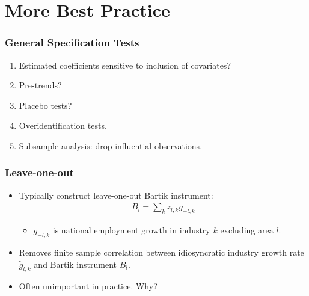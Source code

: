\documentclass[english,xcolor=svgnames]{beamer}
\begin{document}
\section{More Best Practice}

\begin{frame}
\frametitle[alignment=center]{General Specification Tests}
\begin{enumerate}
	\item Estimated coefficients sensitive to inclusion of covariates?
	\item Pre-trends?
	\item Placebo tests?
	\item Overidentification tests.
	\item Subsample analysis: drop influential observations.
\end{enumerate}
\end{frame}

\begin{frame}
\frametitle[alignment=center]{Leave-one-out}
\begin{itemize}
	\item Typically construct leave-one-out Bartik instrument:
	\begin{align*}
		B_l = \sum_k z_{l,k}g_{-l,k}
	\end{align*}
	\begin{itemize}
		\item $g_{-l,k}$ is national employment growth in industry $k$ excluding area $l$.
	\end{itemize}
	\item Removes finite sample correlation between idiosyncratic industry growth rate $\tilde{g}_{l,k}$ and Bartik instrument $B_l$.
	\item Often unimportant in practice. Why?
\end{itemize}
\end{frame}
\end{document}

